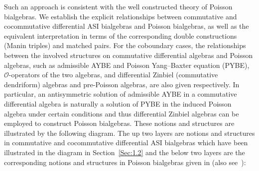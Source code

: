 \documentclass[pdftex]{sigma}
\numberwithin{equation}{section}
\begin{document}
Such an approach is consistent with the well constructed theory of
Poisson bialgebras. We establish the explicit relationships
between commutative and cocommutative differential ASI bialgebras
and Poisson bialgebras, as well as the equivalent interpretation
in terms of the corresponding double constructions (Manin triples)
and matched pairs. For the coboundary cases, the relationships
between the involved structures on commutative differential
algebras and Poisson algebras, such as admissible AYBE and Poisson
Yang--Baxter equation (PYBE), $\mathcal{O}$-operators of the two
algebras, and differential Zinbiel (commutative dendriform)
algebras and pre-Poisson algebras, are also given respectively. In particular,
an antisymmetric solution of admissible AYBE in a commutative
differential algebra is naturally a solution of PYBE in the
induced Poisson algebra under certain conditions and thus
differential Zinbiel algebras can be employed to construct Poisson
bialgebras. These notions and structures are illustrated by the
following diagram. The up two layers are notions and structures in
commutative and cocommutative differential ASI bialgebras which
have been illustrated in the diagram in Section~\ref{Sec:1.2} and
the below two layers are the corresponding notions and structures
in Poisson bialgebras given in \cite{ni2013poisson} (also see~\cite{liu2020noncommutative}):
\end{document}
